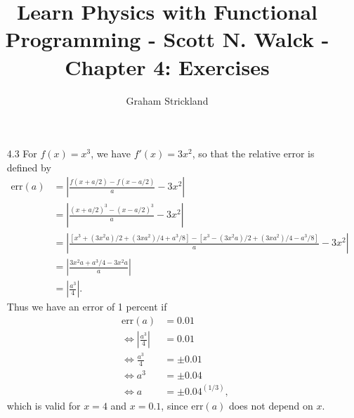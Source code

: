 \documentclass{article}
\title{Learn Physics with Functional Programming - Scott N. Walck - Chapter 4: Exercises}
\author{Graham Strickland}
\begin{document}
\maketitle  

\begin{itemize}
\item[4.3]
    For $f(x) = x^3$, we have $f'(x) = 3x^2$, so that the relative error is defined by
    \begin{equation*}
        \begin{split}
            \text{err}(a) &= \left| \frac{f(x + a/2) - f(x - a/2)}{a} - 3x^2 \right| \\
            &= \left| \frac{(x + a/2)^3 - (x - a/2)^3}{a} - 3x^2 \right| \\
            &= \left| \frac{[x^3 + (3x^2a)/2 + (3xa^2)/4 + a^3/8] - [x^3 - (3x^2a)/2 + (3xa^2)/4 - a^3/8]}{a} - 3x^2 \right| \\
            &= \left| \frac{3x^2a + a^3/4 - 3x^2a}{a} \right| \\
            &= \left| \frac{a^3}{4} \right|.
        \end{split}
    \end{equation*}
    \qquad Thus we have an error of 1 percent if 
    \begin{equation*}
        \begin{split}
            \text{err}(a) &= 0.01 \\
            \Leftrightarrow \left|\frac{a^3}{4}\right| &= 0.01 \\
            \Leftrightarrow \frac{a^3}{4} &= \pm 0.01 \\
            \Leftrightarrow a^3 &= \pm 0.04 \\
            \Leftrightarrow a &= \pm {0.04}^{(1/3)},
        \end{split}
    \end{equation*}
    which is valid for $x = 4$ and $x = 0.1$, since $\text{err}(a)$ does not depend on $x$.
\end{itemize}
\end{document}
